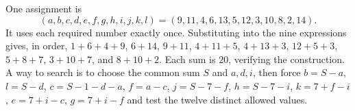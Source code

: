 One assignment is\[(a,b,c,d,e,f,g,h,i,j,k,l)=(9,11,4,6,13,5,12,3,10,8,2,14).\]It uses each required number exactly once. Substituting into the nine expressions gives, in order, $1+6+4+9$, $6+14$, $9+11$, $4+11+5$, $4+13+3$, $12+5+3$, $5+8+7$, $3+10+7$, and $8+10+2$. Each sum is $20$, verifying the construction. A way to search is to choose the common sum $S$ and $a,d,i$, then force $b=S-a$, $l=S-d$, $c=S-1-d-a$, $f=a-c$, $j=S-7-f$, $h=S-7-i$, $k=7+f-i$, $e=7+i-c$, $g=7+i-f$ and test the twelve distinct allowed values.
